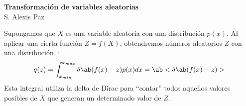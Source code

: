 \documentclass[12pt]{article}
\begin{document}
\begin{center}
\Large\vspace*{-8ex}
\textbf{Transformación de variables aleatorias}\\[1ex]
\normalsize S. Alexis Paz
\end{center}

Supongamos que $X$ es una variable aleatoria con una distribución $p(x)$. Al
aplicar una cierta función $Z=f(X)$, obtendremos números aleatorios $Z$ con una
distribución~\cite{gillespie_1983}:
\begin{align}
  q(z)=\int_{x_{min}}^{x_{max}} \delta\ab(f(x)-z) p(x) dx=\ab<\delta\ab(f(x)-z)> \label{qz}
\end{align}
Esta integral utiliza la delta de Dirac para ``contar'' todos aquellos
valores posibles de $X$ que generan un determinado valor de $Z$.
\end{document}
